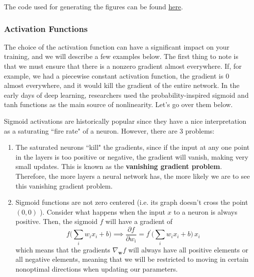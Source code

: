     \begin{code} 
      The code used for generating the figures can be found \href{code/01_MLP/initialization.ipynb}{here}. 
    \end{code}
    
  \subsubsection{Activation Functions} 

    The choice of the activation function can have a significant impact on your training, and we will describe a few examples below. The first thing to note is that we must ensure that there is a nonzero gradient almost everywhere. If, for example, we had a piecewise constant activation function, the gradient is $0$ almost everywhere, and it would kill the gradient of the entire network. In the early days of deep learning, researchers used the probability-inspired sigmoid and tanh functions as the main source of nonlinearity. Let's go over them below. 

    \begin{definition}[Sigmoid]
      Sigmoid activations are historically popular since they have a nice interpretation as a saturating ``fire rate" of a neuron. However, there are 3 problems: 
      \begin{enumerate}
        \item The saturated neurons ``kill" the gradients, since if the input at any one point in the layers is too positive or negative, the gradient will vanish, making very small updates. This is known as the \textbf{vanishing gradient problem}. Therefore, the more layers a neural network has, the more likely we are to see this vanishing gradient problem. 
        \item Sigmoid functions are not zero centered (i.e. its graph doesn't cross the point $(0, 0)$ ). Consider what happens when the input $x$ to a neuron is always positive. Then, the sigmoid $f$ will have a gradient of 
        \begin{equation}
          f \bigg( \sum_i w_i x_i + b \bigg) \implies \frac{\partial f}{\partial w_i} = f^\prime \bigg( \sum_i w_i x_i + b \bigg)\, x_i
        \end{equation}
        which means that the gradients $\nabla_\mathbf{w} f$ will always have all positive elements or all negative elements, meaning that we will be restricted to moving in certain nonoptimal directions when updating our parameters. 
      \end{enumerate}
    \end{definition} 

